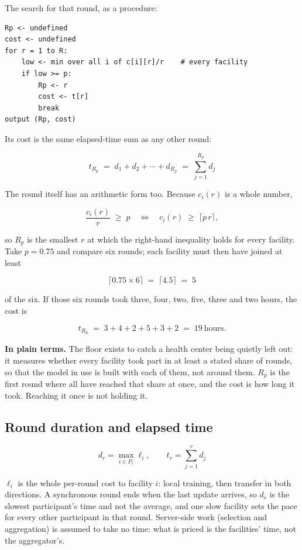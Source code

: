 \noindent
The search for that round, as a procedure:

{\small
\begin{verbatim}
Rp <- undefined
cost <- undefined
for r = 1 to R:
    low <- min over all i of c[i][r]/r    # every facility
    if low >= p:
        Rp <- r
        cost <- t[r]
        break
output (Rp, cost)
\end{verbatim}
}

\noindent
Its cost is the same elapsed-time sum as any other round:

\begin{equation}
t_{R_p} \;=\; d_1 + d_2 + \cdots + d_{R_p} \;=\; \sum_{j=1}^{R_p} d_j
\label{eq:rfloor-cost}
\end{equation}

\noindent
The round itself has an arithmetic form too. Because $c_i(r)$ is a whole number,

\[
\frac{c_i(r)}{r} \;\ge\; p \quad\Longleftrightarrow\quad c_i(r) \;\ge\; \lceil p\,r \rceil,
\]

\noindent
so $R_p$ is the smallest $r$ at which the right-hand inequality holds for every facility. Take
$p = 0.75$ and compare six rounds; each facility must then have joined at least

\[
\lceil 0.75 \times 6 \rceil \;=\; \lceil 4.5 \rceil \;=\; 5
\]

\noindent
of the six. If those six rounds took three, four, two, five, three and two hours, the cost is

\[
t_{R_p} \;=\; 3 + 4 + 2 + 5 + 3 + 2 \;=\; 19\ \text{hours}.
\]

\noindent\textbf{In plain terms.} The floor exists to catch a health center being quietly left out:
it measures whether every facility took part in at least a stated share of rounds, so that the
model in use is built with each of them, not around them. $R_p$ is the first round where all have
reached that share at once, and the cost is how long it took. Reaching it once is not holding it.

\subsection{Round duration and elapsed time}

\begin{equation}
d_r = \max_{i \in P_r} \ell_i,
\qquad t_r = \sum_{j=1}^{r} d_j
\label{eq:duration}
\end{equation}

\noindent
$\ell_i$ is the whole per-round cost to facility $i$: local training, then transfer in both
directions. A synchronous round ends when the last update arrives, so $d_r$ is the slowest
participant's time and not the average, and one slow facility sets the pace for every other
participant in that round. Server-side work (selection and aggregation) is assumed to take no
time: what is priced is the facilities' time, not the aggregator's.

